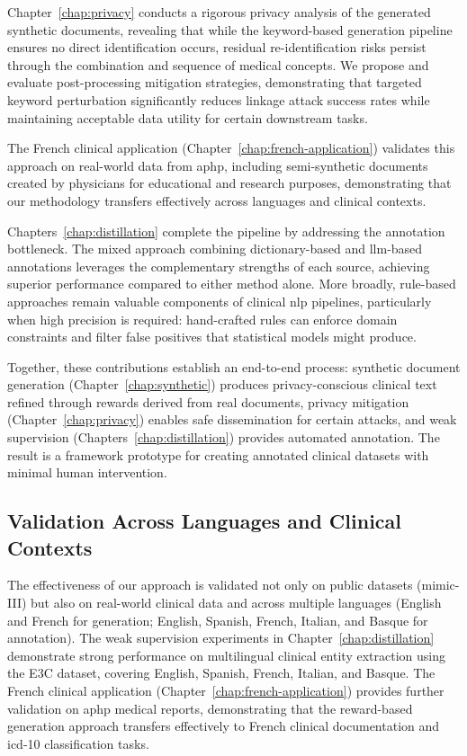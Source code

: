 Chapter~\ref{chap:privacy} conducts a rigorous privacy analysis of the generated synthetic documents, revealing that while the keyword-based generation pipeline ensures no direct identification occurs, residual re-identification risks persist through the combination and sequence of medical concepts.
We propose and evaluate post-processing mitigation strategies, demonstrating that targeted keyword perturbation significantly reduces linkage attack success rates while maintaining acceptable data utility for certain downstream tasks.

The French clinical application (Chapter~\ref{chap:french-application}) validates this approach on real-world data from \gls{aphp}, including semi-synthetic documents created by physicians for educational and research purposes, demonstrating that our methodology transfers effectively across languages and clinical contexts.

Chapters~\ref{chap:distillation} complete the pipeline by addressing the annotation bottleneck.
The mixed approach combining dictionary-based and \gls{llm}-based annotations leverages the complementary strengths of each source, achieving superior performance compared to either method alone.
More broadly, rule-based approaches remain valuable components of clinical \gls{nlp} pipelines, particularly when high precision is required: hand-crafted rules can enforce domain constraints and filter false positives that statistical models might produce.

Together, these contributions establish an end-to-end process: synthetic document generation (Chapter~\ref{chap:synthetic}) produces privacy-conscious clinical text refined through rewards derived from real documents, privacy mitigation (Chapter~\ref{chap:privacy}) enables safe dissemination for certain attacks, and weak supervision (Chapters~\ref{chap:distillation}) provides automated annotation.
The result is a framework prototype for creating annotated clinical datasets with minimal human intervention.

\subsection{Validation Across Languages and Clinical Contexts}

The effectiveness of our approach is validated not only on public datasets (\gls{mimic}-III) but also on real-world clinical data and across multiple languages (English and French for generation; English, Spanish, French, Italian, and Basque for annotation).
The weak supervision experiments in Chapter~\ref{chap:distillation} demonstrate strong performance on multilingual clinical entity extraction using the E3C dataset, covering English, Spanish, French, Italian, and Basque.
The French clinical application (Chapter~\ref{chap:french-application}) provides further validation on \gls{aphp} medical reports, demonstrating that the reward-based generation approach transfers effectively to French clinical documentation and \gls{icd}-10 classification tasks.

